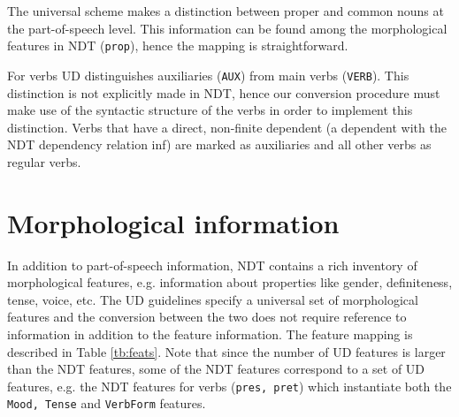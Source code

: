 \documentclass[11pt,a4paper]{article}
\begin{document}

The universal scheme makes a distinction between proper and common
nouns at the part-of-speech level. This information can be found among
the morphological features in NDT ({\tt prop}), hence the mapping is
straightforward.

For verbs UD distinguishes auxiliaries ({\tt AUX}) from main
verbs ({\tt VERB}).  This distinction is not explicitly made in
NDT, hence our conversion procedure must make use of the syntactic
structure of the verbs in order to implement this distinction. Verbs
that have a direct, non-finite dependent (a dependent with the NDT
dependency relation {\sc inf}) are marked as auxiliaries and all other
verbs as regular verbs.

\section{Morphological information}
In addition to part-of-speech information, NDT contains a rich
inventory of morphological features, e.g. information about properties
like gender, definiteness, tense, voice, etc. The UD guidelines
specify a universal set of morphological features and the conversion
between the two does not require reference to
information in addition to the feature information. The feature
mapping is described in Table \ref{tb:feats}.  Note that since the
number of UD features is larger than the NDT features, some of the NDT
features correspond to a set of UD features, e.g. the NDT features for
verbs ({\tt pres, pret}) which instantiate both the {\tt Mood, Tense}
and {\tt VerbForm} features.

\end{document}
